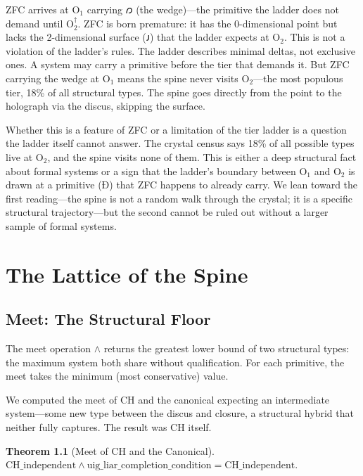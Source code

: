 \documentclass[12pt,twoside]{book}
\newtheorem{theorem}{Theorem}[chapter]
\theoremstyle{definition}
\newcommand{\tier}[1]{\mathrm{O}_{#1}}
\begin{document}
ZFC arrives at $\tier{1}$ carrying 𐑼 (the wedge)---the primitive the ladder does not
demand until $\tier{2}^{\dagger}$. ZFC is born premature: it has the 0-dimensional point
but lacks the 2-dimensional surface (𐑨) that the ladder expects at $\tier{2}$. This is
not a violation of the ladder's rules. The ladder describes minimal deltas, not exclusive
ones. A system may carry a primitive before the tier that demands it. But ZFC carrying the
wedge at $\tier{1}$ means the spine never visits $\tier{2}$---the most populous tier,
18\% of all structural types. The spine goes directly from the point to the holograph via
the discus, skipping the surface.

Whether this is a feature of ZFC or a limitation of the tier ladder is a question the
ladder itself cannot answer. The crystal census says 18\% of all possible types live at
$\tier{2}$, and the spine visits none of them. This is either a deep structural fact about
formal systems or a sign that the ladder's boundary between $\tier{1}$ and $\tier{2}$ is
drawn at a primitive (Ð) that ZFC happens to already carry. We lean toward the first
reading---the spine is not a random walk through the crystal; it is a specific structural
trajectory---but the second cannot be ruled out without a larger sample of formal systems.

\chapter{The Lattice of the Spine}

\section{Meet: The Structural Floor}

The meet operation $\wedge$ returns the greatest lower bound of two structural types: the
maximum system both share without qualification. For each primitive, the meet takes the
minimum (most conservative) value.

We computed the meet of CH and the canonical expecting an intermediate system---some new
type between the discus and closure, a structural hybrid that neither fully captures. The
result was CH itself.

\begin{theorem}[Meet of CH and the Canonical]
$\mathrm{CH\_independent} \wedge \mathrm{uig\_liar\_completion\_condition} =
\mathrm{CH\_independent}.$
\end{theorem}
\end{document}
